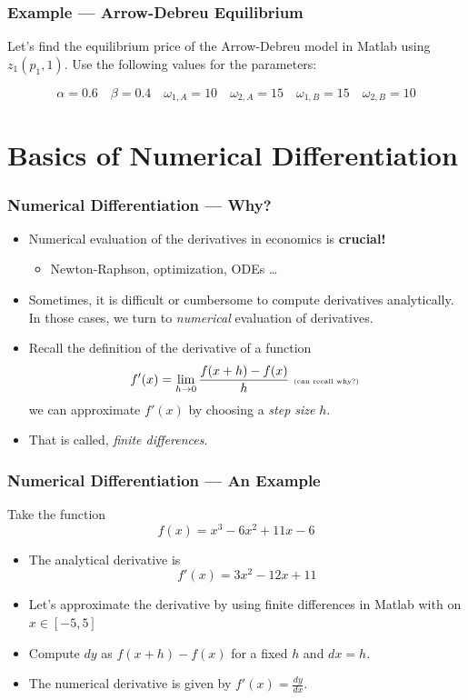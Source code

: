 \documentclass[11pt,xcolor={svgnames},aspectratio=169,usepdftitle=false,notheorems]{beamer}
\begin{document}
\begin{frame}[c]
  \frametitle{Example --- Arrow-Debreu Equilibrium}
 \begin{exercise}
 Let's find the equilibrium price of the Arrow-Debreu model in Matlab using $z_1(p_1,1)$. Use the following values for the parameters:

 \[
   \alpha = 0.6 \quad \beta = 0.4 \quad \omega_{1,A} = 10 \quad \omega_{2,A} = 15 \quad \omega_{1,B} = 15 \quad \omega_{2,B} = 10
 \]
 \end{exercise} 
\end{frame}

\section{Basics of Numerical Differentiation}

\begin{frame}
  \frametitle{Numerical Differentiation --- Why?}
\begin{itemize}
  \item Numerical evaluation of the derivatives in economics is \alert{\textbf{crucial!}}
  \begin{itemize}
    \item Newton-Raphson, optimization, ODEs \ldots
  \end{itemize}
  \item Sometimes, it is difficult or cumbersome to compute derivatives analytically. In those cases, we turn to \textit{numerical} evaluation of derivatives.
  \item Recall the definition of the derivative of a function
  \[
  f'(x) = \lim_{h\rightarrow 0} \frac{f(x+h) - f(x)}{h} \text{ \tiny (can recall why?) }
  \]
  we can approximate $f'(x)$ by choosing a \textit{step size} $h$.
  \item That is called, \textit{finite differences}.
\end{itemize}
\end{frame}

\begin{frame}
  \frametitle{Numerical Differentiation --- An Example}
Take the function 
\[
f(x) = x^3 - 6x^2 + 11x - 6
\]
\begin{itemize}
  \item The analytical derivative is 
  \[
  f'(x) = 3x^2 - 12x + 11
  \]
  \item Let's approximate the derivative by using finite differences in Matlab with on $x\in [-5,5]$
  \item Compute $dy$ as $f(x+h) - f(x)$ for a fixed $h$ and $dx = h$.
  \item The numerical derivative is given by $f'(x) = \frac{dy}{dx}$.
\end{itemize}
\end{frame}
\end{document}
